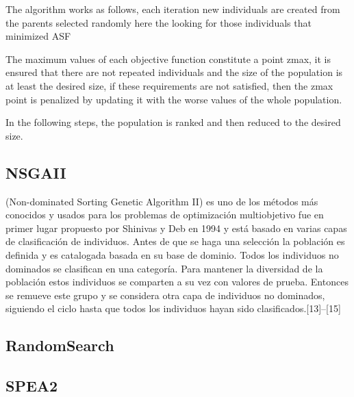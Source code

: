The algorithm works as follows, each iteration new individuals are created from the parents selected randomly  here the looking for those individuals that minimized ASF

The maximum values of each objective function constitute a point zmax, it is ensured that there are not repeated individuals and the size of the population is at least the desired size, if these requirements are not satisfied, then the zmax point is penalized by updating it with the worse values of the whole population.

In the following steps, the population is ranked and then reduced to the desired size.

\subsection{NSGAII}
(Non-dominated Sorting Genetic Algorithm II) es uno de los métodos más conocidos y usados para los problemas de optimización multiobjetivo fue en primer lugar propuesto por Shinivas y Deb en 1994 y está basado en varias capas de clasificación de individuos. Antes de que se haga una selección la población es definida y es catalogada basada en su base de dominio. Todos los individuos no dominados se clasifican en una categoría. Para mantener la diversidad de la población estos individuos se comparten a su vez con valores de prueba. Entonces se remueve este grupo y se considera otra capa de individuos no dominados, siguiendo el ciclo hasta que todos los individuos hayan sido clasificados.[13]–[15]\\
\subsection{RandomSearch}

\subsection{SPEA2}